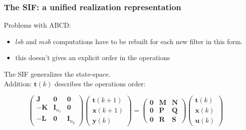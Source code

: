 \begin{frame}
	\frametitle{The SIF: a unified realization representation}
	Problems with ABCD:
	\begin{itemize}
		\item $lsb$ and $msb$ computations have to be rebuilt for each new filter in this form.
		\item this doesn't gives an explicit order in the operations
	\end{itemize}

	The SIF generalizes the state-space.\\
	Addition: $\boldsymbol{t}(k)$ describes the operations order:

	\begin{equation} \label{sifdef}
		\begin{pmatrix}
			\boldsymbol{J} & \boldsymbol{0} & \boldsymbol{0} \\
			\boldsymbol{-K} & \boldsymbol{I}_{n_x} & \boldsymbol{0} \\
			\boldsymbol{-L} & \boldsymbol{0} & \boldsymbol{I}_{n_y} 
		\end{pmatrix}
		\begin{pmatrix}
			\boldsymbol{t} (k+1)  \\
			\boldsymbol{x} (k+1)  \\
			\boldsymbol{y} (k) 
		\end{pmatrix}
		=
		\begin{pmatrix}
			\boldsymbol{0} & \boldsymbol{M} & \boldsymbol{N} \\
			\boldsymbol{0} & \boldsymbol{P} & \boldsymbol{Q} \\
			\boldsymbol{0} & \boldsymbol{R} & \boldsymbol{S} 
		\end{pmatrix}
		\begin{pmatrix}
			\boldsymbol{t} (k)  \\
			\boldsymbol{x} (k)  \\
			\boldsymbol{u} (k) 
		\end{pmatrix}
	\end{equation}

\end{frame}

